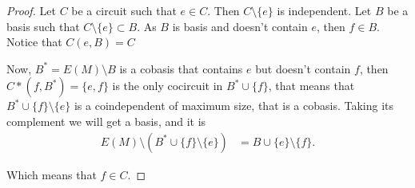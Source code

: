\begin{proof}
        Let $C$ be a circuit such that $e \in C$. Then $C \setminus \{e\}$ is independent. Let $B$ be a basis such that 
        $C \setminus \{e\} \subset B$. As $B$ is basis and doesn't contain $e$, then $f \in B$. Notice that $C(e, B) = C$\pn 
        
        Now, $B^* = E(M) \setminus B$ is a cobasis that contains $e$ but doesn't contain $f$, then $C*(f, B^*) = \{e, f\}$ is the
        only cocircuit in $B^* \cup \{f\}$, that means that $B^* \cup \{f\} \setminus \{e\}$ is a coindependent of maximum size, that is
        a cobasis. Taking its complement we will get a basis, and it is
        \begin{align}
                E(M) \setminus (B^* \cup \{f\} \setminus \{e\}) &= B \cup \{e\} \setminus \{ f \}.
        \end{align}
        
        Which means that $f \in C$.
\end{proof}